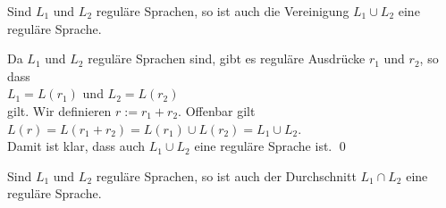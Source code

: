 \begin{Satz}
  Sind $L_1$ und $L_2$ regul\"are Sprachen, so ist auch die Vereinigung $L_1 \cup L_2$ 
  eine regul\"are Sprache.
\end{Satz}

\proof
Da $L_1$ und $L_2$ regul\"are Sprachen sind, gibt es regul\"are Ausdr\"ucke $r_1$ und $r_2$, so dass
\\[0.2cm]
\hspace*{1.3cm}
$L_1 = L(r_1)$ \quad und \quad $L_2 = L(r_2)$
\\[0.2cm]
gilt.  Wir definieren $r := r_1 + r_2$.  Offenbar gilt
\\[0.2cm]
\hspace*{1.3cm}
$L(r) = L(r_1 + r_2) = L(r_1) \cup L(r_2) = L_1 \cup L_2$.
\\[0.2cm]
Damit ist klar, dass auch $L_1 \cup L_2$ eine regul\"are Sprache ist. \qed

\begin{Satz} \label{satz:schnitt}
  Sind $L_1$ und $L_2$ regul\"are Sprachen, so ist auch der Durchschnitt $L_1 \cap L_2$ 
  eine regul\"are Sprache.
\end{Satz}

